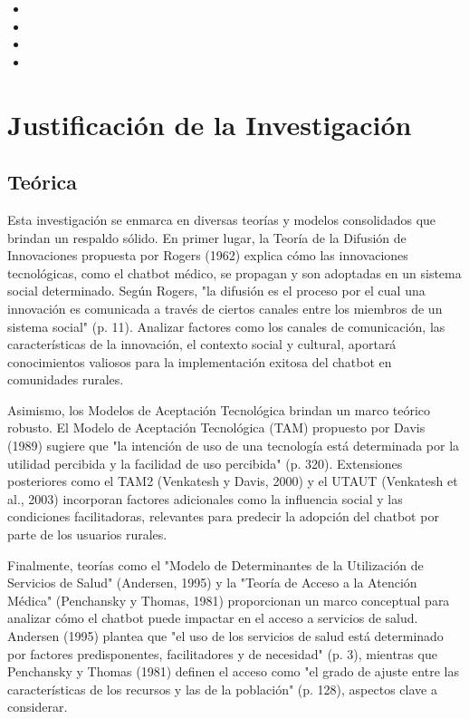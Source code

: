 \begin{itemize}
	\item {\Objone}
	\item {\Objtwo}
	\item {\Objthree}
	\item {\Objfour}
\end{itemize}

\section{Justificación de la Investigación}

\subsection{Teórica}
Esta investigación se enmarca en diversas teorías y modelos consolidados que brindan un respaldo sólido. En primer lugar, la Teoría de la Difusión de Innovaciones propuesta por Rogers (1962) explica cómo las innovaciones tecnológicas, como el chatbot médico, se propagan y son adoptadas en un sistema social determinado. Según Rogers, "la difusión es el proceso por el cual una innovación es comunicada a través de ciertos canales entre los miembros de un sistema social" (p. 11). Analizar factores como los canales de comunicación, las características de la innovación, el contexto social y cultural, aportará conocimientos valiosos para la implementación exitosa del chatbot en comunidades rurales.

Asimismo, los Modelos de Aceptación Tecnológica brindan un marco teórico robusto. El Modelo de Aceptación Tecnológica (TAM) propuesto por Davis (1989) sugiere que "la intención de uso de una tecnología está determinada por la utilidad percibida y la facilidad de uso percibida" (p. 320). Extensiones posteriores como el TAM2 (Venkatesh y Davis, 2000) y el UTAUT (Venkatesh et al., 2003) incorporan factores adicionales como la influencia social y las condiciones facilitadoras, relevantes para predecir la adopción del chatbot por parte de los usuarios rurales.

Finalmente, teorías como el "Modelo de Determinantes de la Utilización de Servicios de Salud" (Andersen, 1995) y la "Teoría de Acceso a la Atención Médica" (Penchansky y Thomas, 1981) proporcionan un marco conceptual para analizar cómo el chatbot puede impactar en el acceso a servicios de salud. Andersen (1995) plantea que "el uso de los servicios de salud está determinado por factores predisponentes, facilitadores y de necesidad" (p. 3), mientras que Penchansky y Thomas (1981) definen el acceso como "el grado de ajuste entre las características de los recursos y las de la población" (p. 128), aspectos clave a considerar.

